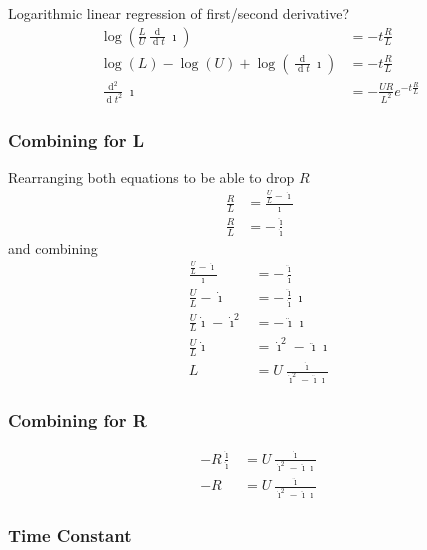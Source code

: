 \documentclass[12pt,a4paper,oneside,openany]{article}
\DeclareMathOperator{\ud}{d}
\begin{document}
Logarithmic linear regression of first/second derivative?
\begin{align}
\log \left(\frac{L}{U} \frac{\ud}{\ud t} \imath \right) &= -t\frac{R}{L} \\
\log \left( L \right) - \log \left(U \right) + \log \left(\frac{\ud}{\ud t} \imath \right) &= -t\frac{R}{L} \\
\frac{\ud^2}{\ud t^2} \imath &= -\frac{UR}{L^2} e^{-t\frac{R}{L}}
\end{align}



\subsubsection{Combining for L}

Rearranging both equations to be able to drop $R$
\begin{align}
\frac{R}{L} &= \frac{\frac{U}{L} - \dot{\imath}}{\imath} \\
\frac{R}{L} &= - \frac{ \ddot{\imath}}{ \dot{\imath}}
\end{align}
and combining
\begin{align}
\frac{\frac{U}{L} -  \dot{\imath}}{\imath} &= - \frac{\ddot{\imath}}{ \dot{\imath}} \\
\frac{U}{L} -  \dot{\imath} &= - \frac{\ddot{\imath}}{\dot{\imath}} \imath \\
\frac{U}{L}  \dot{\imath} - \dot{\imath}^2 &= - \ddot{\imath} \imath \\
\frac{U}{L}  \dot{\imath} &= \dot{\imath}^2 - \ddot{\imath} \imath \\
L &= U \frac{ \dot{\imath}}{ \dot{\imath}^2 - \ddot{\imath} \imath}
\end{align}

\subsubsection{Combining for R}
\begin{align}
- R \frac{\dot{\imath}}{\ddot{\imath}} &= U \frac{ \dot{\imath}}{ \dot{\imath}^2 - \ddot{\imath} \imath} \\
- R &= U \frac{ \ddot{\imath}}{ \dot{\imath}^2 - \ddot{\imath} \imath}
\end{align}

\subsubsection{Time Constant}
\end{document}
